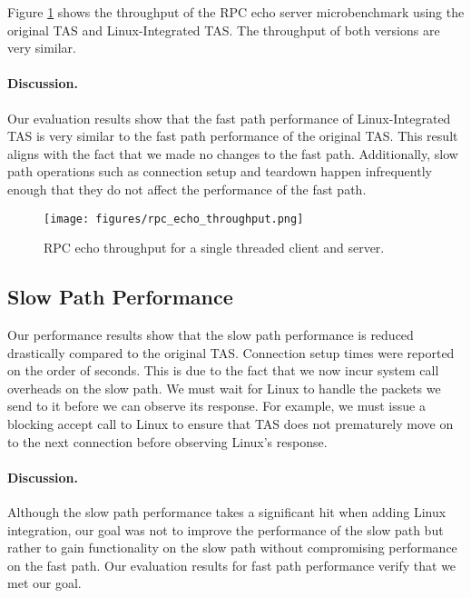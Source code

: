 Figure \ref{fig:fastpath-throughput} shows the throughput of the RPC echo server
microbenchmark using the original TAS and Linux-Integrated TAS. The throughput 
of both versions are very similar.

\paragraph{Discussion.} Our evaluation results show that the fast path 
performance of Linux-Integrated TAS is very similar to the fast path performance 
of the original TAS. This result aligns with the fact that we made no changes to
the fast path. Additionally, slow path operations such as connection setup and
teardown happen infrequently enough that they do not affect the performance of 
the fast path.

\begin{figure}
  \centering
  \texttt{[image: figures/rpc\_echo\_throughput.png]}
  \caption{RPC echo throughput for a single threaded client and server.}
  \label{fig:fastpath-throughput}
  \vspace{-2pt}
\end{figure}

\subsection{Slow Path Performance}

Our performance results show that the slow path performance is reduced 
drastically compared to the original TAS. Connection setup times were reported 
on the order of seconds. This is due to the fact that we now incur system call 
overheads on the slow path. We must wait for Linux to handle the packets we send 
to it before we can observe its response. For example, we must issue a blocking 
accept call to Linux to ensure that TAS does not prematurely move on to the next 
connection before observing Linux's response.

\paragraph{Discussion.} Although the slow path performance takes a significant
hit when adding Linux integration, our goal was not to improve the performance of
the slow path but rather to gain functionality on the slow path without
compromising performance on the fast path. Our evaluation results for fast path
performance verify that we met our goal.
